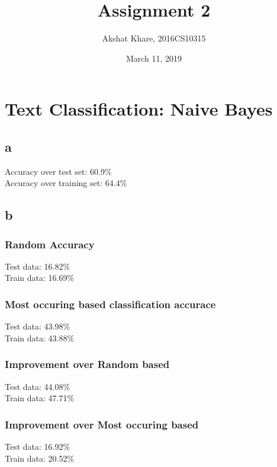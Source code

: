 \documentclass[10pt]{article}
\title{Assignment 2}
\author {Akshat Khare, 2016CS10315}
\date{March 11, 2019}
\begin{document}
\maketitle

\section{Text Classification: Naive Bayes}
\subsection{a}
Accuracy over test set: 60.9\% \\
Accuracy over training set: 64.4\% \\ 
\subsection{b}

\subsubsection{Random Accuracy}
Test data: 16.82\% \\ 
Train data: 16.69\% \\ 
\subsubsection{Most occuring based classification accurace}
Test data: 43.98\% \\
Train data: 43.88\% \\
\subsubsection{Improvement over Random based}
Test data: 44.08\% \\
Train data: 47.71\% \\
\subsubsection{Improvement over Most occuring based}
Test data: 16.92\% \\
Train data: 20.52\% \\
\end{document}
